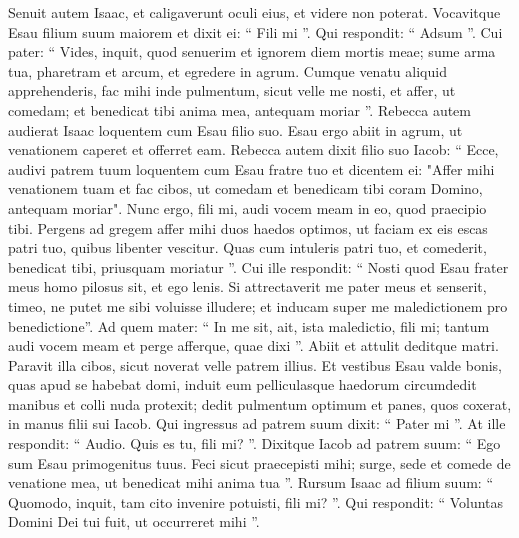 \begin{biblechapter}
\begin{biblechapter}
\begin{biblechapter}
\begin{biblechapter}
\begin{biblechapter}
\begin{biblechapter}
\begin{biblechapter}
\begin{biblechapter}
\begin{biblechapter}
\begin{biblechapter}
\begin{biblechapter}
\begin{biblechapter}
\begin{biblechapter}
\begin{biblechapter}
\begin{biblechapter}
\begin{biblechapter}
\begin{biblechapter}
\begin{biblechapter}
\begin{biblechapter}
\begin{biblechapter}
\begin{biblechapter}
\begin{biblechapter}
\begin{biblechapter}
\begin{biblechapter}
\begin{biblechapter}
\begin{biblechapter}
\begin{biblechapter}
\verse Senuit autem Isaac, et caligaverunt oculi eius, et videre non poterat. Vocavitque Esau filium suum maiorem et dixit ei: “ Fili mi ”. Qui respondit: “ Adsum ”. 
\verse Cui pater: “ Vides, inquit, quod senuerim et ignorem diem mortis meae; 
\verse sume arma tua, pharetram et arcum, et egredere in agrum. Cumque venatu aliquid apprehenderis, 
\verse fac mihi inde pulmentum, sicut velle me nosti, et affer, ut comedam; et benedicat tibi anima mea, antequam moriar ”.
 \verse Rebecca autem audierat Isaac loquentem cum Esau filio suo. Esau ergo abiit in agrum, ut venationem caperet et offerret eam. 
\verse Rebecca autem dixit filio suo Iacob: “ Ecce, audivi patrem tuum loquentem cum Esau fratre tuo et dicentem ei: 
\verse "Affer mihi venationem tuam et fac cibos, ut comedam et benedicam tibi coram Domino, antequam moriar". 
\verse Nunc ergo, fili mi, audi vocem meam in eo, quod praecipio tibi. 
\verse Pergens ad gregem affer mihi duos haedos optimos, ut faciam ex eis escas patri tuo, quibus libenter vescitur. 
\verse Quas cum intuleris patri tuo, et comederit, benedicat tibi, priusquam moriatur ”. 
\verse Cui ille respondit: “ Nosti quod Esau frater meus homo pilosus sit, et ego lenis. 
\verse Si attrectaverit me pater meus et senserit, timeo, ne putet me sibi voluisse illudere; et inducam super me maledictionem pro benedictione”. 
 \verse Ad quem mater: “ In me sit, ait, ista maledictio, fili mi; tantum audi vocem meam et perge afferque, quae dixi ”.
 \verse Abiit et attulit deditque matri. Paravit illa cibos, sicut noverat velle patrem illius. 
\verse Et vestibus Esau valde bonis, quas apud se habebat domi, induit eum 
\verse pelliculasque haedorum circumdedit manibus et colli nuda protexit; 
\verse dedit pulmentum optimum et panes, quos coxerat, in manus filii sui Iacob.
 \verse Qui ingressus ad patrem suum dixit: “ Pater mi ”. At ille respondit: “ Audio. Quis es tu, fili mi? ”. 
\verse Dixitque Iacob ad patrem suum: “ Ego sum Esau primogenitus tuus. Feci sicut praecepisti mihi; surge, sede et comede de venatione mea, ut benedicat mihi anima tua ”. 
\verse Rursum Isaac ad filium suum: “ Quomodo, inquit, tam cito invenire potuisti, fili mi? ”. Qui respondit: “ Voluntas Domini Dei tui fuit, ut occurreret mihi ”.

\end{biblechapter}
\end{biblechapter}
\end{biblechapter}
\end{biblechapter}
\end{biblechapter}
\end{biblechapter}
\end{biblechapter}
\end{biblechapter}
\end{biblechapter}
\end{biblechapter}
\end{biblechapter}
\end{biblechapter}
\end{biblechapter}
\end{biblechapter}
\end{biblechapter}
\end{biblechapter}
\end{biblechapter}
\end{biblechapter}
\end{biblechapter}
\end{biblechapter}
\end{biblechapter}
\end{biblechapter}
\end{biblechapter}
\end{biblechapter}
\end{biblechapter}
\end{biblechapter}
\end{biblechapter}
